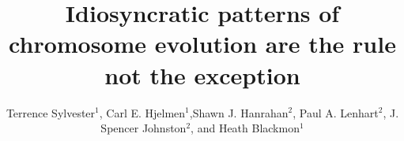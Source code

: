 \documentclass[]{rsos}%
\begin{document}
\title{Idiosyncratic patterns of chromosome evolution are the rule not the exception}

\author{%
Terrence Sylvester$^{1}$, Carl E. Hjelmen$^{1}$,Shawn J. Hanrahan$^{2}$, Paul A. Lenhart$^{2}$, J. Spencer Johnston$^{2}$, and Heath Blackmon$^{1}$}

\address{$^{1}$Department of Biology; Texas A\&M University; College Station, TX 77843, USA\\
$^{2}$Department of Entomology; Texas A\&M University; College Station, TX 77843, USA}


\subject{Evolutionary Biology}


\end{document}
